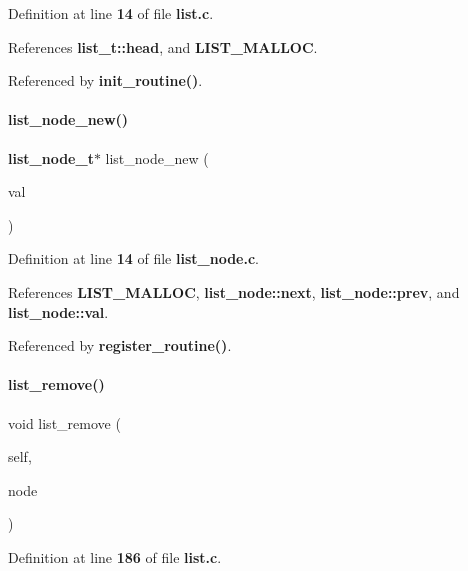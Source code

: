 Definition at line \textbf{ 14} of file \textbf{ list.\+c}.



References \textbf{ list\+\_\+t\+::head}, and \textbf{ L\+I\+S\+T\+\_\+\+M\+A\+L\+L\+OC}.



Referenced by \textbf{ init\+\_\+routine()}.

\mbox{\label{list_8h_a4ef36e0519514ac481d0d7e0b439d431}} 
\paragraph{list\+\_\+node\+\_\+new()}
{\footnotesize\ttfamily \textbf{ list\+\_\+node\+\_\+t}$\ast$ list\+\_\+node\+\_\+new (\begin{DoxyParamCaption}\item[{void $\ast$}]{val }\end{DoxyParamCaption})}



Definition at line \textbf{ 14} of file \textbf{ list\+\_\+node.\+c}.



References \textbf{ L\+I\+S\+T\+\_\+\+M\+A\+L\+L\+OC}, \textbf{ list\+\_\+node\+::next}, \textbf{ list\+\_\+node\+::prev}, and \textbf{ list\+\_\+node\+::val}.



Referenced by \textbf{ register\+\_\+routine()}.

\mbox{\label{list_8h_a5ef7843a8a481124bce3e93541ba379a}} 
\paragraph{list\+\_\+remove()}
{\footnotesize\ttfamily void list\+\_\+remove (\begin{DoxyParamCaption}\item[{\textbf{ list\+\_\+t} $\ast$}]{self,  }\item[{\textbf{ list\+\_\+node\+\_\+t} $\ast$}]{node }\end{DoxyParamCaption})}



Definition at line \textbf{ 186} of file \textbf{ list.\+c}.



